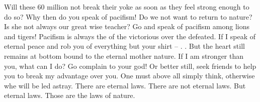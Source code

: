 Will these 60 million not break their yoke as soon as they feel strong enough to do so? Why then do you speak of pacifism! Do we not want to return to nature? Is she not always our great wise teacher? Go and speak of pacifism among lions and tigers! Pacifism is always the  of the victorious over the defeated. If I speak of eternal peace and rob you of everything but your shirt -- . . But the heart still remains at bottom bound to the eternal mother nature. If I am stronger than you, what can I do? Go complain to your god! Or better still, seek friends to help you to break my advantage over you. One must above all simply think, otherwise whe will be led astray. There are eternal laws. There are not eternal laws. But eternal laws. Those are the laws of nature.

